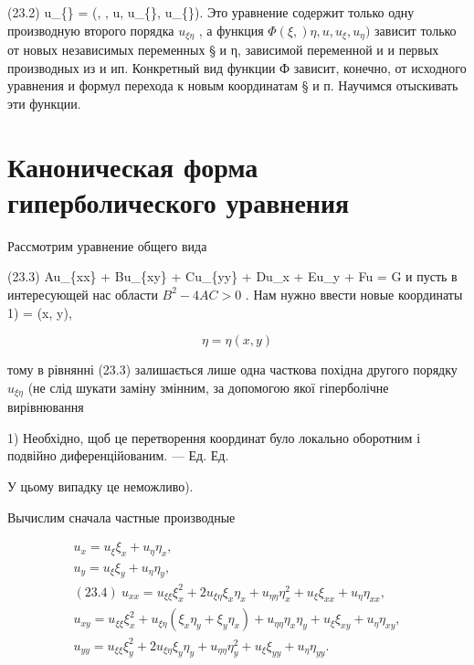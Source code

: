 \documentclass[
  ukrainian,
]{article}
\begin{document}
(23.2) u\_\{\xi\eta\} = \Phi(\xi, \eta, u, u\_\{\xi\}, u\_\{\eta\}). Это
уравнение содержит только одну производную второго порядка
\(u_{\xi\eta}\) , а функция \(\Phi(\xi,) \eta,u,u_{\xi},u_{\eta})\)
зависит только от новых независимых переменных § и η, зависимой
переменной и и первых производных из и ип. Конкретный вид функции Ф
зависит, конечно, от исходного уравнения и формул перехода к новым
координатам § и п. Научимся отыскивать эти функции.

\section{Каноническая форма гиперболического
уравнения}\label{ux43aux430ux43dux43eux43dux438ux447ux435ux441ux43aux430ux44f-ux444ux43eux440ux43cux430-ux433ux438ux43fux435ux440ux431ux43eux43bux438ux447ux435ux441ux43aux43eux433ux43e-ux443ux440ux430ux432ux43dux435ux43dux438ux44f}

Рассмотрим уравнение общего вида

(23.3) Au\_\{xx\} + Bu\_\{xy\} + Cu\_\{yy\} + Du\_x + Eu\_y + Fu = G и
пусть в интересующей нас области \(B^2 - 4AC > 0\) . Нам нужно ввести
новые координаты 1) \xi = \xi(x, y),

\[
\eta = \eta(x, y)
\]

тому в рівнянні (23.3) залишається лише одна часткова похідна другого
порядку \(u_{\xi\eta}\) (не слід шукати заміну змінним, за допомогою
якої гіперболічне вирівнювання

1) Необхідно, щоб це перетворення координат було локально оборотним і
подвійно диференційованим. --- Ед. Ед.

У цьому випадку це неможливо).

Вычислим сначала частные производные

\[
\begin{array}{c} u_x = u_\xi \xi_x + u_\eta \eta_x, \\ u_y = u_\xi \xi_y + u_\eta \eta_y, \\ (23.4) \ u_{xx} = u_{\xi\xi} \xi_x^2 + 2u_{\xi\eta} \xi_x \eta_x + u_{\eta\eta} \eta_x^2 + u_{\xi} \xi_{xx} + u_{\eta} \eta_{xx}, \\ u_{xy} = u_{\xi\xi} \xi_x^2 + u_{\xi\eta} (\xi_x \eta_y + \xi_y \eta_x) + u_{\eta\eta} \eta_x \eta_y + u_{\xi} \xi_{xy} + u_{\eta} \eta_{xy}, \\ u_{yy} = u_{\xi\xi} \xi_y^2 + 2u_{\xi\eta} \xi_y \eta_y + u_{\eta\eta} \eta_y^2 + u_{\xi} \xi_{yy} + u_{\eta} \eta_{yy}. \end{array}
\]
\end{document}
